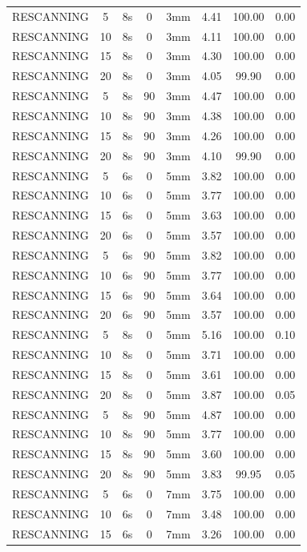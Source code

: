 \documentclass[type=dr, dr=rernat, accentcolor=tud7b,colorbacktitle, bigchapter, openright, twoside, 12pt ]{tudthesis}
\begin{document}
\begin{table}[H]
\begin{tabular}{|c|c||c|c|c||c|c|c|}
RESCANNING & 5 & 8s & 0 & 3mm & 4.41 & 100.00 & 0.00 \\
RESCANNING & 10 & 8s & 0 & 3mm & 4.11 & 100.00 & 0.00 \\
RESCANNING & 15 & 8s & 0 & 3mm & 4.30 & 100.00 & 0.00 \\
RESCANNING & 20 & 8s & 0 & 3mm & 4.05 & 99.90 & 0.00 \\
RESCANNING & 5 & 8s & 90 & 3mm & 4.47 & 100.00 & 0.00 \\
RESCANNING & 10 & 8s & 90 & 3mm & 4.38 & 100.00 & 0.00 \\
RESCANNING & 15 & 8s & 90 & 3mm & 4.26 & 100.00 & 0.00 \\
RESCANNING & 20 & 8s & 90 & 3mm & 4.10 & 99.90 & 0.00 \\
RESCANNING & 5 & 6s & 0 & 5mm & 3.82 & 100.00 & 0.00 \\
RESCANNING & 10 & 6s & 0 & 5mm & 3.77 & 100.00 & 0.00 \\
RESCANNING & 15 & 6s & 0 & 5mm & 3.63 & 100.00 & 0.00 \\
RESCANNING & 20 & 6s & 0 & 5mm & 3.57 & 100.00 & 0.00 \\
RESCANNING & 5 & 6s & 90 & 5mm & 3.82 & 100.00 & 0.00 \\
RESCANNING & 10 & 6s & 90 & 5mm & 3.77 & 100.00 & 0.00 \\
RESCANNING & 15 & 6s & 90 & 5mm & 3.64 & 100.00 & 0.00 \\
RESCANNING & 20 & 6s & 90 & 5mm & 3.57 & 100.00 & 0.00 \\
RESCANNING & 5 & 8s & 0 & 5mm & 5.16 & 100.00 & 0.10 \\
RESCANNING & 10 & 8s & 0 & 5mm & 3.71 & 100.00 & 0.00 \\
RESCANNING & 15 & 8s & 0 & 5mm & 3.61 & 100.00 & 0.00 \\
RESCANNING & 20 & 8s & 0 & 5mm & 3.87 & 100.00 & 0.05 \\
RESCANNING & 5 & 8s & 90 & 5mm & 4.87 & 100.00 & 0.00 \\
RESCANNING & 10 & 8s & 90 & 5mm & 3.77 & 100.00 & 0.00 \\
RESCANNING & 15 & 8s & 90 & 5mm & 3.60 & 100.00 & 0.00 \\
RESCANNING & 20 & 8s & 90 & 5mm & 3.83 & 99.95 & 0.05 \\
RESCANNING & 5 & 6s & 0 & 7mm & 3.75 & 100.00 & 0.00 \\
RESCANNING & 10 & 6s & 0 & 7mm & 3.48 & 100.00 & 0.00 \\
RESCANNING & 15 & 6s & 0 & 7mm & 3.26 & 100.00 & 0.00 \\

\end{tabular}
\end{table}
\end{document}
